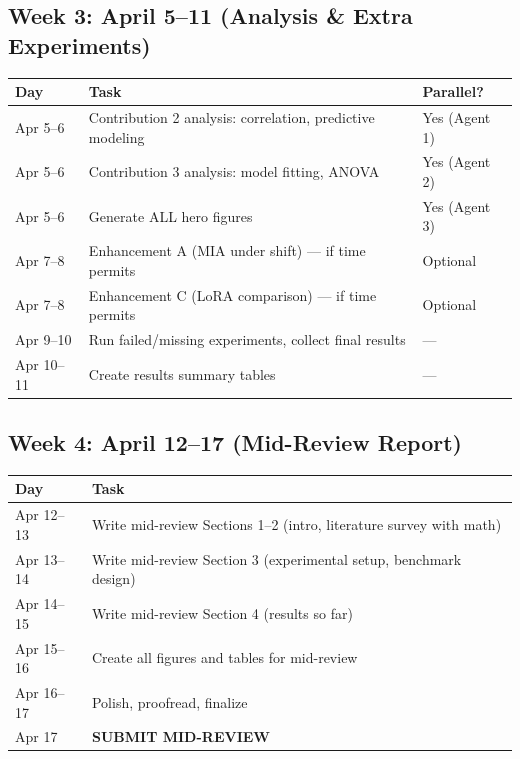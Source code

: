 \documentclass[11pt,a4paper]{article}
\begin{document}
\subsection{Week 3: April 5--11 (Analysis \& Extra Experiments)}

\begin{small}
\begin{longtable}{@{}p{2cm}p{8.5cm}p{2.5cm}@{}}
\toprule
\textbf{Day} & \textbf{Task} & \textbf{Parallel?} \\
\midrule
\endhead
Apr 5--6 & Contribution 2 analysis: correlation, predictive modeling & Yes (Agent 1) \\
Apr 5--6 & Contribution 3 analysis: model fitting, ANOVA & Yes (Agent 2) \\
Apr 5--6 & Generate ALL hero figures & Yes (Agent 3) \\
Apr 7--8 & Enhancement A (MIA under shift) --- if time permits & Optional \\
Apr 7--8 & Enhancement C (LoRA comparison) --- if time permits & Optional \\
Apr 9--10 & Run failed/missing experiments, collect final results & --- \\
Apr 10--11 & Create results summary tables & --- \\
\bottomrule
\end{longtable}
\end{small}

\subsection{Week 4: April 12--17 (Mid-Review Report)}

\begin{small}
\begin{longtable}{@{}p{2cm}p{10cm}@{}}
\toprule
\textbf{Day} & \textbf{Task} \\
\midrule
\endhead
Apr 12--13 & Write mid-review Sections 1--2 (intro, literature survey with math) \\
Apr 13--14 & Write mid-review Section 3 (experimental setup, benchmark design) \\
Apr 14--15 & Write mid-review Section 4 (results so far) \\
Apr 15--16 & Create all figures and tables for mid-review \\
Apr 16--17 & Polish, proofread, finalize \\
Apr 17 & \textbf{SUBMIT MID-REVIEW} \\
\bottomrule
\end{longtable}
\end{small}
\end{document}
